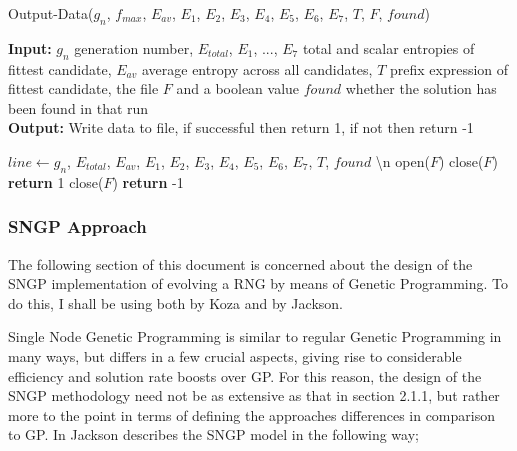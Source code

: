 \documentclass[a4paper,10.5pt]{article}
\begin{document}
\begin{algorithm}[H]
  \caption{Output-Data($g_n$, $f_{max}$, $E_{av}$, $E_1$, $E_2$, $E_3$, $E_4$, $E_5$, $E_6$, $E_7$, $T$, $F$, $found$)}
  \textbf{Input:} $g_n$ generation number, $E_{total}$, $E_1$, ..., $E_7$  total and scalar entropies of fittest candidate, $E_{av}$ average entropy across all candidates,  $T$ prefix expression of fittest candidate, the file $F$ and a boolean value $found$ whether the solution has been found in that run\\
  \textbf{Output:} Write data to file, if successful then return 1, if not then return -1\\
  \begin{algorithmic}[1]
   	\State $line \gets g_n$, $E_{total}$, $E_{av}$, $E_1$, $E_2$, $E_3$, $E_4$, $E_5$, $E_6$, $E_7$, $T$, $found$ \textbackslash n
   	\State open($F$)
		\State close($F$)
		\State \textbf{return} 1
	\Else
		\State close($F$)
		\State \textbf{return} -1
	\EndIf
	
  \end{algorithmic}
\end{algorithm}

\newpage

\subsubsection{SNGP Approach}

The following section of this document is concerned about the design of the SNGP implementation of evolving a RNG by means of Genetic Programming. To do this, I shall be using both \cite{kozarng} by Koza and \cite{jacksonsngp2} by Jackson.

Single Node Genetic Programming is similar to regular Genetic Programming in many ways, but differs in a few crucial aspects, giving rise to considerable efficiency and solution rate boosts over GP. For this reason, the design of the SNGP methodology need not be as extensive as that in section 2.1.1, but rather more to the point in terms of defining the approaches differences in comparison to GP. In \cite[p.50-51]{jacksonsngp2} Jackson describes the SNGP model in the following way;
\end{document}
